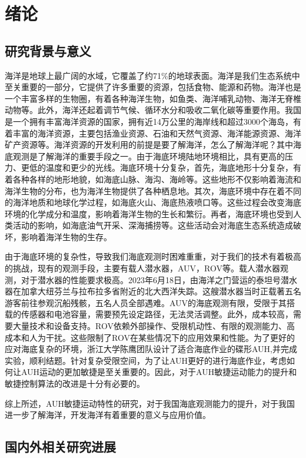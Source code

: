 \chapter{绪论}

\section{研究背景与意义}
 
海洋是地球上最广阔的水域，它覆盖了约71\%的地球表面。海洋是我们生态系统中至关重要的一部分，它提供了许多重要的资源，包括食物、能源和药物。海洋也是一个丰富多样的生物圈，有着各种海洋生物，如鱼类、海洋哺乳动物、海洋无脊椎动物等。此外，海洋还起着调节气候、循环水分和吸收二氧化碳等重要作用。我国是一个拥有丰富海洋资源的国家，拥有近14万公里的海岸线和超过3000个海岛，有着丰富的海洋资源，主要包括渔业资源、石油和天然气资源、海洋能源资源、海洋矿产资源等。海洋资源的开发利用的前提是要了解海洋，怎么了解海洋呢？其中海底观测是了解海洋的重要手段之一。由于海底环境陆地环境相比，具有更高的压力、更低的温度和更少的光线。海底环境十分复杂，首先，海底地形十分复杂，有着各种各样的地形地貌，如海底山脉、海沟、海岭等。这些地形不仅影响着海流和海洋生物的分布，也为海洋生物提供了各种栖息地。其次，海底环境中存在着不同的海洋地质和地球化学过程，如海底火山、海底热液喷口等。这些过程会改变海底环境的化学成分和温度，影响着海洋生物的生长和繁衍。再者，海底环境也受到人类活动的影响，如海底油气开采、深海捕捞等。这些活动会对海底生态系统造成破坏，影响着海洋生物的生存。


由于海底环境的复杂性，导致我们海底观测时困难重重，对于我们的技术有着极高的挑战，现有的观测手段，主要有载人潜水器，AUV，ROV等。载人潜水器观测，对于潜水器的性能要求极高。2023年6月18日，由海洋之门营运的泰坦号潜水器在加拿大纽芬兰与拉布拉多省附近的北大西洋失踪。这艘潜水器当时正载著五名游客前往参观沉船残骸，五名人员全部遇难。AUV的海底观测有限，受限于其搭载的传感器和电池容量，需要预先设定路径，无法灵活调整。此外，成本较高，需要大量技术和设备支持。ROV依赖外部操作、受限机动性、有限的观测能力、高成本和人为干扰。这些限制了ROV在某些情况下的应用效果和性能。为了更好的应对海底复杂的环境，浙江大学陈鹰团队设计了适合海底作业的碟形AUH,并完成实验，顺利结题。针对复杂受限空间，为了让AUH更好的进行海底作业，考虑如何让AUH运动的更加敏捷是至关重要的。因此，对于AUH敏捷运动能力的提升和敏捷控制算法的改进是十分有必要的。

综上所述，AUH敏捷运动特性的研究，对于我国海底观测能力的提升，对于我国进一步了解海洋，开发海洋有着重要的意义与应用价值。

\section{国内外相关研究进展}

